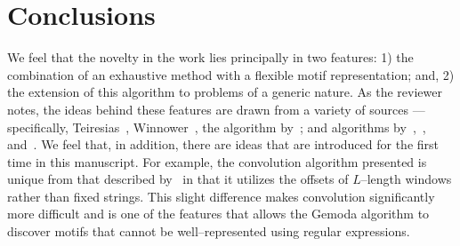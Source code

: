 \chapter{Conclusions}
    We feel that the novelty in the work lies principally
    in two features: 1) the combination of an exhaustive
    method with a flexible motif representation; and,
    2) the extension of this algorithm to problems
    of a generic nature.  As the reviewer notes,
    the ideas behind these features are drawn
    from a variety of sources --- specifically,
    Teiresias~\citep{rigoutsos1998combinatorial},
    Winnower~\citep{pevzner2000combinatorial}, the
    algorithm by~\cite{mancheron2003pattern};
    and algorithms by~\cite{zaki2000scalable},~\cite{zaki1998theoretical},
    and~\cite{mancheron2003pattern}.  We feel that,
    in addition, there are ideas
    that are introduced for the first time in this
    manuscript.  For example, the convolution algorithm presented
    is unique from that described by~\cite{rigoutsos1998combinatorial} 
    in that it utilizes the offsets of $L$--length windows rather
    than fixed strings.  This slight difference makes
    convolution significantly more difficult and is one
    of the features that allows the Gemoda algorithm to
    discover motifs that cannot be well--represented using
    regular expressions.
